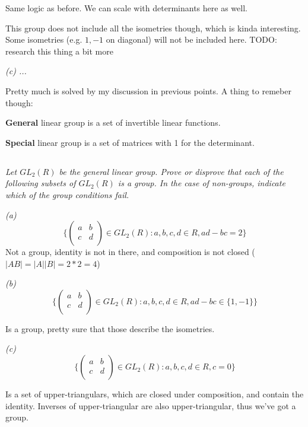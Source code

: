 \documentclass[11pt,oneside,titlepage]{book}
\newcommand{\set}[1]{\{ #1 \}}
\begin{document}
Same logic as before. We can scale with determinants here as well.

This group does not include all the isometries though, which is kinda
interesting.  Some isometries (e.g. $1, -1$ on diagonal) will not be
included here. TODO: research this thing a bit more

\textit{(c) ... }

Pretty much is solved by my discussion in previous points. A thing to
remeber though:

\textbf{General} linear group is a set of invertible linear functions.

\textbf{Special} linear group is a set of matrices with 1 for the
determinant.

\subsection{}

\textit{Let $GL_2(R)$ be the general linear group. Prove or disprove
that each of the following subsets of $GL_2(R)$ is a group. In the
case of non-groups, indicate which of the group conditions fail.  }

\textit{(a)
  $$\set{
  \begin{pmatrix} a & b \\ c & d \\
  \end{pmatrix} \in GL_2(R): a, b, c, d \in R, ad - bc = 2}
  $$
} Not a group, identity is not in there, and composition is not closed
($|A B | = |A| |B| = 2 * 2 = 4$)

\textit{(b)
  $$\set{
  \begin{pmatrix} a & b \\ c & d \\
  \end{pmatrix} \in GL_2(R): a, b, c, d \in R, ad - bc \in \set{1,
-1}}
  $$
}

Is a group, pretty sure that those describe the isometries.

\textit{(c)
  $$\set{
  \begin{pmatrix} a & b \\ c & d \\
  \end{pmatrix} \in GL_2(R): a, b, c, d \in R, c = 0}
  $$
}

Is a set of upper-triangulars, which are closed under composition, and
contain the identity.  Inverses of upper-triangular are also
upper-triangular, thus we've got a group.
\end{document}

